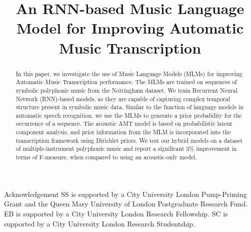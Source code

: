 \documentclass{article}
\title{An RNN-based Music Language Model for Improving Automatic Music Transcription}
\begin{document}
%
\maketitle
%

\begin{abstract}
In this paper, we investigate the use of Music Language Models (MLMs) for improving Automatic Music Transcription performance. The MLMs are trained on sequences of symbolic polyphonic music from the Nottingham dataset. We train Recurrent Neural Network (RNN)-based models, as they are capable of capturing complex temporal structure present in symbolic music data. Similar to the function of language models in automatic speech recognition, we use the MLMs to generate a prior probability for the occurrence of a sequence. The acoustic AMT model is based on probabilistic latent component analysis, and prior information from the MLM is incorporated into the transcription framework using Dirichlet priors. We test our hybrid models on a dataset of multiple-instrument polyphonic music and report a significant 3\% improvement in terms of F-measure, when compared to using an acoustic-only model.

\end{abstract}












\vspace{-0.15in}
\begin{section}{Acknowledgement}
 SS is supported by a City University London Pump-Priming Grant and the Queen Mary University of London Postgraduate Research Fund. EB is supported by a City University London Research Fellowship. SC is supported by a City University London Research Studentship.
\end{section}


{\small 

}
\end{document}
